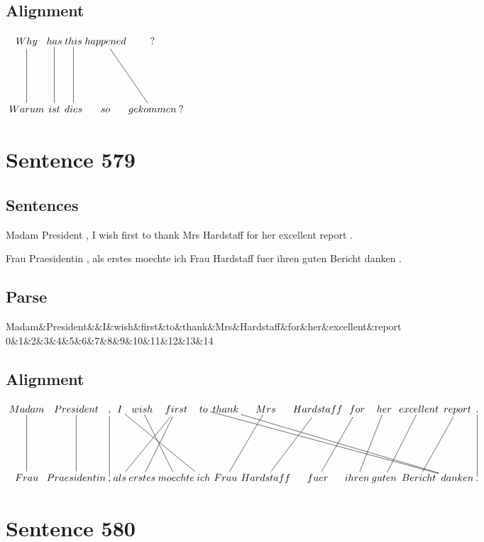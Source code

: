 \documentclass{report}
\begin{document}
\subsection*{Alignment}
\scriptsize{
$
\xymatrix@C-2.3pc{
Why \ar @{-} [dd] & has \ar @{-} [dd] & this \ar @{-} [dd] & happened \ar @{-} [ddr] & ?\\\\
Warum & ist & dies & so & gekommen & ?
}$}
\newpage\section*{Sentence 579}

\subsection*{Sentences}
Madam President , I wish first to thank Mrs Hardstaff for her excellent report .

\noindent Frau Praesidentin , als erstes moechte ich Frau Hardstaff fuer ihren guten Bericht danken .



\subsection*{Parse}
\begin{dependency}[theme=simple]
\begin{deptext}[column sep=.5cm, row sep=.1ex]
Madam\&President\&\&I\&wish\&first\&to\&thank\&Mrs\&Hardstaff\&for\&her\&excellent\&report\\
0\&1\&2\&3\&4\&5\&6\&7\&8\&9\&10\&11\&12\&13\&14\\
\end{deptext}
\end{dependency}


\subsection*{Alignment}
\scriptsize{
$
\xymatrix@C-2.3pc{
Madam \ar @{-} [dd] & President \ar @{-} [dd] & , \ar @{-} [dd] & I \ar @{-} [ddrrr] & wish \ar @{-} [ddr] & first \ar @{-} [ddl] \ar @{-} [ddll] & to \ar @{-} [ddrrrrrrr] & thank \ar @{-} [ddrrrrrr] & Mrs \ar @{-} [ddl] & Hardstaff \ar @{-} [ddl] & for \ar @{-} [ddl] & her \ar @{-} [ddl] & excellent \ar @{-} [ddl] & report \ar @{-} [ddl] & . \ar @{-} [dd]\\\\
Frau & Praesidentin & , & als & erstes & moechte & ich & Frau & Hardstaff & fuer & ihren & guten & Bericht & danken & .
}$}
\newpage\section*{Sentence 580}
\end{document}
